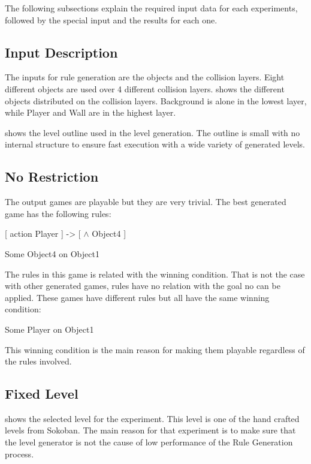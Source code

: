 The following subsections explain the required input data for each experiments, followed by the special input and the results for each one.

\subsection{Input Description}
The inputs for rule generation are the objects and the collision layers. Eight different objects are used over 4 different collision layers.  shows the different objects distributed on the collision layers. Background is alone in the lowest layer, while Player and Wall are in the highest layer.


 shows the level outline used in the level generation. The outline is small with no internal structure to ensure fast execution with a wide variety of generated levels.


\subsection{No Restriction}
The output games are playable but they are very trivial. The best generated game has the following rules:
\begin{center}
[ action Player ] -> [ $\wedge$ Object4 ]
\end{center}
\begin{center}
Some Object4 on Object1
\end{center}
The rules in this game is related with the winning condition. That is not the case with other generated games, rules have no relation with the goal no can be applied. These games have different rules but all have the same winning condition:
\begin{center}
Some Player on Object1
\end{center}
This winning condition is the main reason for making them playable regardless of the rules involved.

\subsection{Fixed Level}
 shows the selected level for the experiment. This level is one of the hand crafted levels from Sokoban. The main reason for that experiment is to make sure that the level generator is not the cause of low performance of the Rule Generation process.\\\par

